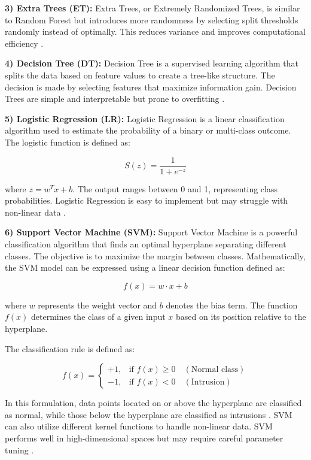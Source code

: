 \documentclass[conference]{IEEEtran}
\begin{document}
\textbf{3) Extra Trees (ET):}  
Extra Trees, or Extremely Randomized Trees, is similar to Random Forest but introduces more randomness by selecting split thresholds randomly instead of optimally. This reduces variance and improves computational efficiency \cite{b6}.

\textbf{4) Decision Tree (DT):}  
Decision Tree is a supervised learning algorithm that splits the data based on feature values to create a tree-like structure. The decision is made by selecting features that maximize information gain. Decision Trees are simple and interpretable but prone to overfitting \cite{b6}.

\textbf{5) Logistic Regression (LR):}  
Logistic Regression is a linear classification algorithm used to estimate the probability of a binary or multi-class outcome. The logistic function is defined as:

\begin{equation}
S(z) = \frac{1}{1 + e^{-z}}
\end{equation}

where $z = w^T x + b$. The output ranges between 0 and 1, representing class probabilities. Logistic Regression is easy to implement but may struggle with non-linear data \cite{b6}.

\textbf{6) Support Vector Machine (SVM):}  
Support Vector Machine is a powerful classification algorithm that finds an optimal hyperplane separating different classes. The objective is to maximize the margin between classes. Mathematically, the SVM model can be expressed using a linear decision function defined as:

\begin{equation}
f(x) = w \cdot x + b
\end{equation}

where $w$ represents the weight vector and $b$ denotes the bias term. The function $f(x)$ determines the class of a given input $x$ based on its position relative to the hyperplane.

The classification rule is defined as:

\begin{equation}
f(x) =
\begin{cases}
+1, & \text{if } f(x) \geq 0 \quad (\text{Normal class}) \\
-1, & \text{if } f(x) < 0 \quad (\text{Intrusion})
\end{cases}
\end{equation}

In this formulation, data points located on or above the hyperplane are classified as normal, while those below the hyperplane are classified as intrusions \cite{b17}. SVM can also utilize different kernel functions to handle non-linear data. SVM performs well in high-dimensional spaces but may require careful parameter tuning \cite{b4}.
\end{document}
